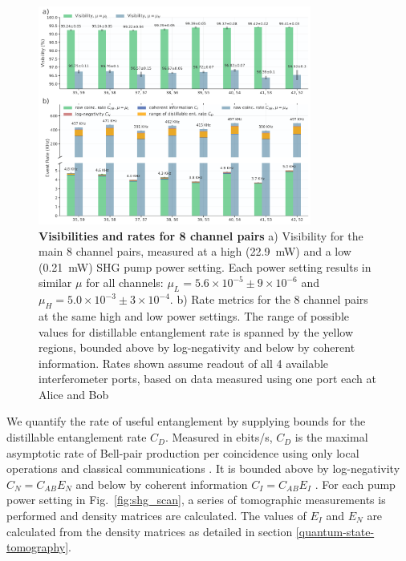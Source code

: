 \documentclass[11pt]{caltech_thesis} %
\begin{document}
\hypertarget{fig:channel_data}{%
\begin{figure}
\centering
\includegraphics[width=0.8\textwidth,height=\textheight]{./chapter_05/figs/8ch_bar_graph_high_power_light.pdf}
\caption[{Visibilities and rates for 8 channel pairs}]{\textbf{Visibilities and rates for 8 channel pairs} a) Visibility for the main 8 channel pairs, measured at a high (22.9~mW) and a low (0.21~mW) SHG pump power setting. Each power setting results in similar $\mu$ for all channels: $\mu_L = 5.6{\times}10^{-5} \pm 9{\times}10^{-6}$ and $\mu_H = 5.0{\times}10^{-3} \pm 3{\times}10^{-4}$. b) Rate metrics for the 8 channel pairs at the same high and low power settings. The range of possible values for distillable entanglement rate is spanned by the yellow regions, bounded above by log-negativity and below by coherent information. Rates shown assume readout of all 4 available interferometer ports, based on data measured using one port each at Alice and Bob}
\label{fig:channel_data}
\end{figure}
}

We quantify the rate of useful entanglement by supplying bounds for the distillable entanglement rate $C_D$. Measured in ebits/s, $C_D$ is the maximal asymptotic rate of Bell-pair production per coincidence using only local operations and classical communications \autocite{Alshowkan2022,Bennett1996}. It is bounded above by log-negativity $C_N = C_{AB} E_N$ and below by coherent information $C_I = C_{AB} E_I$ \autocite{Alshowkan2022}. For each pump power setting in Fig.~\ref{fig:shg_scan}, a series of tomographic measurements is performed and density matrices are calculated. The values of $E_I$ and $E_N$ are calculated from the density matrices as detailed in section \ref{quantum-state-tomography}.
\end{document}
